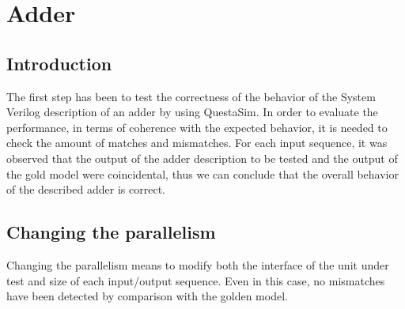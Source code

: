 %
 
\chapter{Adder}
\label{cha2}
\section{Introduction}
The first step has been to test the correctness of the behavior of the System Verilog description of
an adder by using QuestaSim.
In order to evaluate the performance, in terms of coherence with the expected behavior, it is needed
to check the amount of matches and mismatches.
For each input sequence, it was observed that the output of the adder description to be tested
and the output of the gold model were coincidental, thus we can conclude that the overall 
behavior of the described adder is correct.

\section{Changing the parallelism}
Changing the parallelism means to modify both the interface of the unit under test and
size of each input/output sequence.
Even in this case, no mismatches have been detected by comparison with the golden model.

